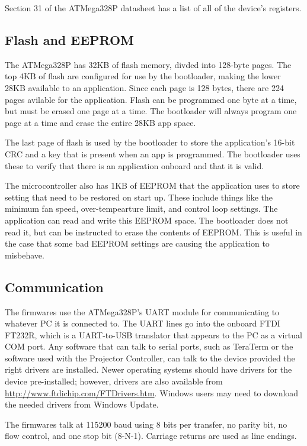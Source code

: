 \documentclass{article}
\begin{document}
Section 31 of the ATMega328P datasheet has a list of all of the device's registers.

\subsection{Flash and EEPROM} \label{ssec:FWflasheeprom}
The ATMega328P has 32KB of flash memory, divded into 128-byte pages.  The top 4KB of flash are
configured for use by the bootloader, making the lower 28KB available to an application.  Since each
page is 128 bytes, there are 224 pages avilable for the application.  Flash can be programmed one
byte at a time, but must be erased one page at a time.  The bootloader will always program one page
at a time and erase the entire 28KB app space.

The last page of flash is used by the bootloader to store the application's 16-bit CRC and a key
that is present when an app is programmed.  The bootloader uses these to verify that there is an
application onboard and that it is valid.

The microcontroller also has 1KB of EEPROM that the application uses to store setting that need to
be restored on start up.  These include things like the minimum fan speed, over-tempearture limit,
and control loop settings.  The application can read and write this EEPROM space.  The bootloader
does not read it, but can be instructed to erase the contents of EEPROM.  This is useful in the case
that some bad EEPROM settings are causing the application to misbehave.

\subsection{Communication} \label{ssec:FWComm}
The firmwares use the ATMega328P's UART module for communicating to whatever PC it is connected to.
The UART lines go into the onboard FTDI FT232R, which is a UART-to-USB translator that appears to
the PC as a virtual COM port.  Any software that can talk to serial ports, such as TeraTerm or the
software used with the Projector Controller, can talk to the device provided the right drivers are
installed.  Newer operating systems should have drivers for the device pre-installed; however,
drivers are also available from \url{http://www.ftdichip.com/FTDrivers.htm}.  Windows users may need
to download the needed drivers from Windows Update.

The firmwares talk at 115200 baud using 8 bits per transfer, no parity bit, no flow control, and one
stop bit (8-N-1).  Carriage returns are used as line endings.
\end{document}
